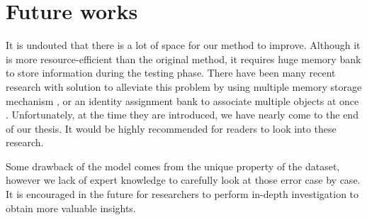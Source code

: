 \section{Future works}

It is undouted that there is a lot of space for our method to improve. Although it is more resource-efficient than the original method, it requires huge memory bank to store information during the testing phase. There have been many recent research with solution to alleviate this problem by using multiple memory storage mechanism \cite{cheng2022xmem}, or an identity assignment bank to associate multiple objects at once \cite{yang2022associating}. Unfortunately, at the time they are introduced, we have nearly come to the end of our thesis. It would be highly recommended for readers to look into these research.

Some drawback of the model comes from the unique property of the dataset, however we lack of expert knowledge to carefully look at those error case by case. It is encouraged in the future for researchers to perform in-depth investigation to obtain more valuable insights.